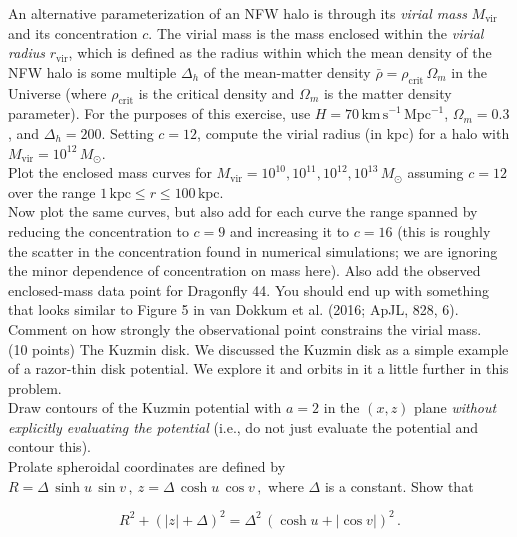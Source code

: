 \documentclass[12pt]{article}
\begin{document}
 An alternative parameterization of an NFW halo is
through its \emph{virial mass} $M_\mathrm{vir}$ and its concentration
$c$. The virial mass is the mass enclosed within the \emph{virial
  radius} $r_\mathrm{vir}$, which is defined as the radius within
which the mean density of the NFW halo is some multiple $\Delta_h$ of
the mean-matter density $\bar{\rho} = \rho_\mathrm{crit}\,\Omega_m$ in
the Universe (where $\rho_\mathrm{crit}$ is the critical density and
$\Omega_m$ is the matter density parameter). For the purposes of this
exercise, use $H = 70\,\mathrm{km\,s}^{-1}\,\mathrm{Mpc}^{-1}$,
$\Omega_m = 0.3$, and $\Delta_h = 200$. Setting $c=12$, compute the
virial radius (in kpc) for a halo with $M_\mathrm{vir} =
10^{12}\,M_\odot$.\\

 Plot the enclosed mass curves for $M_\mathrm{vir} =
10^{10}, 10^{11}, 10^{12}, 10^{13}\,M_\odot$ assuming $c=12$ over the
range $1\,\mathrm{kpc} \leq r \leq 100\,\mathrm{kpc}$.\\

 Now plot the same curves, but also add for each
curve the range spanned by reducing the concentration to $c=9$ and
increasing it to $c=16$ (this is roughly the scatter in the
concentration found in numerical simulations; we are ignoring the
minor dependence of concentration on mass here). Also add the observed
enclosed-mass data point for Dragonfly 44. You should end up with
something that looks similar to Figure 5 in van Dokkum et al. (2016;
ApJL, 828, 6). Comment on how strongly the observational point
constrains the virial mass.\\

 (10 points) The Kuzmin disk. We discussed
the Kuzmin disk as a simple example of a razor-thin disk potential. We
explore it and orbits in it a little further in this problem.\\

 Draw contours of the Kuzmin potential with $a=2$ in
the $(x,z)$ plane \emph{without explicitly evaluating the potential}
(i.e., do not just evaluate the potential and contour this).\\

 Prolate spheroidal coordinates are defined by $R =
\Delta\,\sinh u\,\sin v\,, \ z = \Delta\,\cosh u\,\cos v\,,$ where
$\Delta$ is a constant. Show that

\begin{equation}\label{eq:prolate-rz}
  R^2 + (|z|+\Delta)^2  = \Delta^2\,(\cosh u + |\cos v|)^2\,.
\end{equation}
\end{document}

